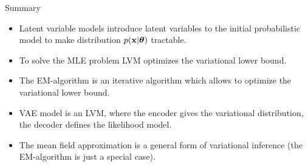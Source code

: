 \begin{frame}{Summary}

\begin{itemize}
	\item Latent variable models introduce latent variables to the initial probabilistic model to make distribution $p(\mathbf{x} | \boldsymbol{\theta})$ tractable.
	\item To solve the MLE problem LVM optimizes the variational lower bound.
	\item The EM-algorithm is an iterative algorithm which allows to optimize the variational lower bound.
	\item VAE model is an LVM, where the encoder gives the variational distribution, the decoder defines the likelihood model.
	\item The mean field approximation is a general form of variational inference (the EM-algorithm is just a special case).
\end{itemize}
\end{frame}
 
